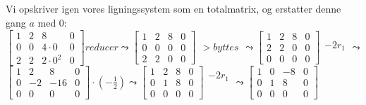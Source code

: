 \documentclass[a4paper,12pt]{article}
\begin{document}
\subsection{}
Vi opskriver igen vores ligningssystem som en totalmatrix, og erstatter denne gang $a$ med 0:\\
$
\left[\begin{array}{ccc|c}
    1 & 2 & 8 & 0 \\
    0 & 0 & 4\cdot0 & 0 \\
    2 & 2 & 2\cdot0^2 & 0
\end{array}\right]
reducer
\leadsto
\left[\begin{array}{ccc|c}
    1 & 2 & 8 & 0 \\
    0 & 0 & 0 & 0 \\
    2 & 2 & 0 & 0
\end{array}\right]
\begin{array}{cccc}
    \\
    \\
    > byttes\\
    \\
\end{array}
\leadsto
\left[\begin{array}{ccc|c}
    1 & 2 & 8 & 0 \\
    2 & 2 & 0 & 0 \\
    0 & 0 & 0 & 0
\end{array}\right]
\begin{array}{ccc}
    \\
    -2r_1\\
    \\
\end{array}
\leadsto
$\\
$
\left[\begin{array}{ccc|c}
    1 & 2 & 8 & 0 \\
    0 & -2 & -16 & 0 \\
    0 & 0 & 0 & 0
\end{array}\right]
\cdot (-\frac{1}{2})
\leadsto
\left[\begin{array}{ccc|c}
    1 & 2 & 8 & 0 \\
    0 & 1 & 8 & 0 \\
    0 & 0 & 0 & 0
\end{array}\right]
\begin{array}{ccc}
    -2r_1\\
    \\
    \\
\end{array}
\leadsto
\left[\begin{array}{ccc|c}
    1 & 0 & -8 & 0 \\
    0 & 1 & 8 & 0 \\
    0 & 0 & 0 & 0
\end{array}\right]
$\\
\end{document}

